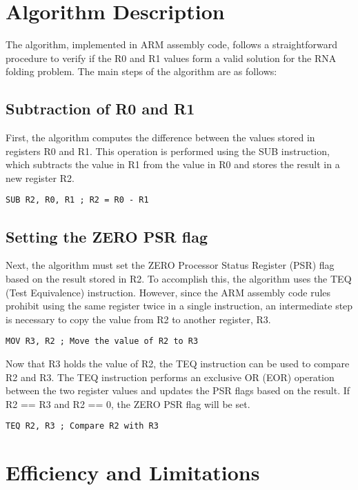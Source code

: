 \section{Algorithm Description}

The algorithm, implemented in ARM assembly code, follows a straightforward procedure to verify if the R0 and R1 values form a valid solution for the RNA folding problem. The main steps of the algorithm are as follows:

\subsection{Subtraction of R0 and R1}

First, the algorithm computes the difference between the values stored in registers R0 and R1. This operation is performed using the SUB instruction, which subtracts the value in R1 from the value in R0 and stores the result in a new register R2.

\begin{verbatim}
SUB R2, R0, R1 ; R2 = R0 - R1
\end{verbatim}

\subsection{Setting the ZERO PSR flag}

Next, the algorithm must set the ZERO Processor Status Register (PSR) flag based on the result stored in R2. To accomplish this, the algorithm uses the TEQ (Test Equivalence) instruction. However, since the ARM assembly code rules prohibit using the same register twice in a single instruction, an intermediate step is necessary to copy the value from R2 to another register, R3.

\begin{verbatim}
MOV R3, R2 ; Move the value of R2 to R3
\end{verbatim}

Now that R3 holds the value of R2, the TEQ instruction can be used to compare R2 and R3. The TEQ instruction performs an exclusive OR (EOR) operation between the two register values and updates the PSR flags based on the result. If R2 == R3 and R2 == 0, the ZERO PSR flag will be set.

\begin{verbatim}
TEQ R2, R3 ; Compare R2 with R3
\end{verbatim}

\section{Efficiency and Limitations}

